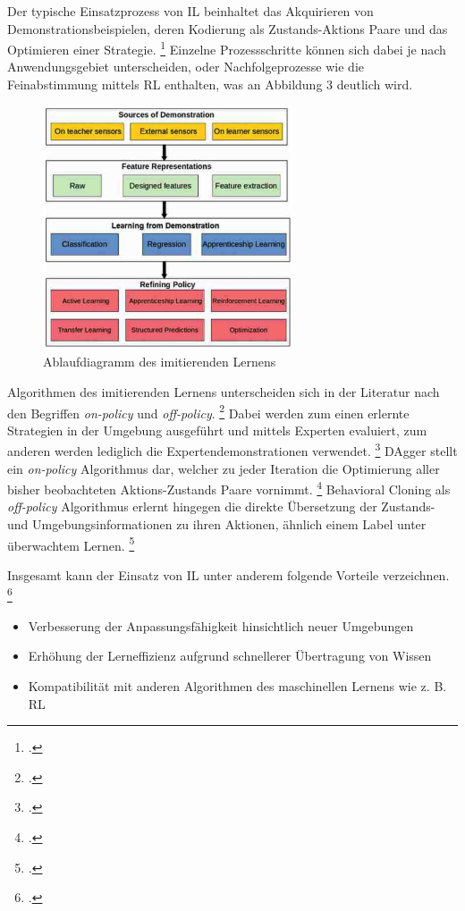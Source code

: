 Der typische Einsatzprozess von IL beinhaltet das Akquirieren von Demonstrationsbeispielen, deren Kodierung als Zustands-Aktions Paare und das Optimieren einer Strategie. \footcite[Vgl.][S. 3]{Hussein.2017}
Einzelne Prozessschritte können sich dabei je nach Anwendungsgebiet unterscheiden, oder Nachfolgeprozesse wie die Feinabstimmung mittels RL enthalten, was an Abbildung 3 deutlich wird.
\begin{figure}[htb]
    \centering
    \includegraphics[height=7.2cm]{lib/graphics/IL flowchart.png}
    \caption[Ablaufdiagramm des imitierenden Lernens]{Ablaufdiagramm des imitierenden Lernens\footnotemark}
    \label{abb:IL-process-flowchart}
\end{figure}

Algorithmen des imitierenden Lernens unterscheiden sich in der Literatur nach den Begriffen \textit{on-policy} und \textit{off-policy}. \footcite[Vgl.][S. 3]{Ashwin.2020}
Dabei werden zum einen erlernte Strategien in der Umgebung ausgeführt und mittels Experten evaluiert, zum anderen werden lediglich die Expertendemonstrationen verwendet. \footcite[Vgl.][S. 3]{Ashwin.2020}
DAgger stellt ein \textit{on-policy} Algorithmus dar, welcher zu jeder Iteration die Optimierung aller bisher beobachteten Aktions-Zustands Paare vornimmt. \footcite[Vgl.][S. 5]{attia.2018}
Behavioral Cloning als \textit{off-policy} Algorithmus erlernt hingegen die direkte Übersetzung der Zustands- und Umgebungsinformationen zu ihren Aktionen, ähnlich einem Label unter überwachtem Lernen. \footcite[Vgl.][S. 4]{fang.2019}

Insgesamt kann der Einsatz von IL unter anderem folgende Vorteile verzeichnen. \footcite[Vgl.][S. 1]{fang.2019}
\begin{itemize}
    \item Verbesserung der Anpassungsfähigkeit hinsichtlich neuer Umgebungen
    \item Erhöhung der Lerneffizienz aufgrund schnellerer Übertragung von Wissen
    \item Kompatibilität mit anderen Algorithmen des maschinellen Lernens wie z. B. RL
\end{itemize}

